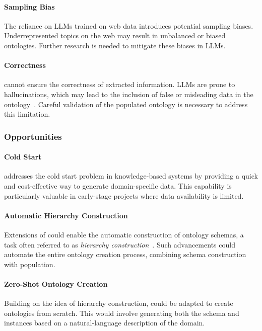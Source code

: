 \paragraph{Sampling Bias}
%
The reliance on \glspl{LLM} trained on web data introduces potential sampling biases.
%
Underrepresented topics on the web may result in unbalanced or biased ontologies.
%
Further research is needed to mitigate these biases in \glspl{LLM}.

\paragraph{Correctness}
%
\llmfkg{} cannot ensure the correctness of extracted information.
%
\glspl{LLM} are prone to hallucinations, which may lead to the inclusion of false or misleading data in the ontology~\cite{placeholder}.
%
Careful validation of the populated ontology is necessary to address this limitation.


\subsubsection{Opportunities}
\label{subsubsec:opportunities}
%
\paragraph{Cold Start}
%
\llmfkg{} addresses the cold start problem in knowledge-based systems by providing a quick and cost-effective way to generate domain-specific data.
%
This capability is particularly valuable in early-stage projects where data availability is limited.

\paragraph{Automatic Hierarchy Construction}
%
Extensions of \llmfkg{} could enable the automatic construction of ontology schemas, a task often referred to as \emph{hierarchy construction}~\cite{placeholder}.
%
Such advancements could automate the entire ontology creation process, combining schema construction with population.


\paragraph{Zero-Shot Ontology Creation}
%
Building on the idea of hierarchy construction, \llmfkg{} could be adapted to create ontologies from scratch.
%
This would involve generating both the schema and instances based on a natural-language description of the domain.

